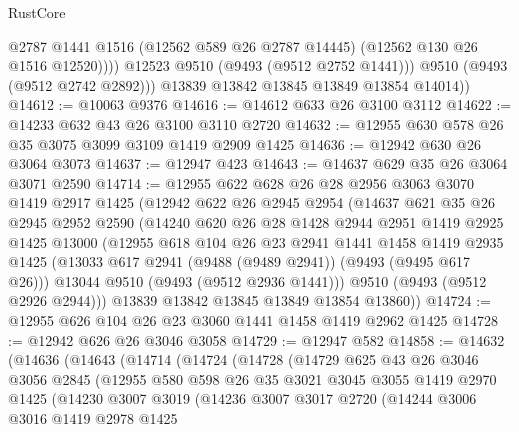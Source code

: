 \begin{lexlean}{RustCore}
\begin{coremodule}
                  @2787
                  @1441
                  @1516
                  (@12562 @589 @26 @2787 @14445)
                  (@12562 @130 @26 @1516 @12520))))
            @12523
            @9510
            (@9493 (@9512 @2752 @1441)))
          @9510
          (@9493 (@9512 @2742 @2892)))
        @13839
        @13842
        @13845
        @13849
        @13854
        @14014))
@14612 := @10063 @9376
@14616 := @14612 @633 @26 @3100 @3112
@14622 := @14233 @632 @43 @26 @3100 @3110 @2720
@14632 := @12955 @630 @578 @26 @35 @3075 @3099 @3109 @1419 @2909 @1425
@14636 := @12942 @630 @26 @3064 @3073
@14637 := @12947 @423
@14643 := @14637 @629 @35 @26 @3064 @3071 @2590
@14714 := @12955
    @622
    @628
    @26
    @28
    @2956
    @3063
    @3070
    @1419
    @2917
    @1425
    (@12942
      @622
      @26
      @2945
      @2954
      (@14637
        @621
        @35
        @26
        @2945
        @2952
        @2590
        (@14240
          @620
          @26
          @28
          @1428
          @2944
          @2951
          @1419
          @2925
          @1425
          @13000
          (@12955
            @618
            @104
            @26
            @23
            @2941
            @1441
            @1458
            @1419
            @2935
            @1425
            (@13033 @617 @2941 (@9488 (@9489 @2941)) (@9493 (@9495 @617 @26)))
            @13044
            @9510
            (@9493 (@9512 @2936 @1441)))
          @9510
          (@9493 (@9512 @2926 @2944)))
        @13839
        @13842
        @13845
        @13849
        @13854
        @13860))
@14724 := @12955 @626 @104 @26 @23 @3060 @1441 @1458 @1419 @2962 @1425
@14728 := @12942 @626 @26 @3046 @3058
@14729 := @12947 @582
@14858 := @14632
    (@14636
      (@14643
        (@14714
          (@14724
            (@14728
              (@14729
                @625
                @43
                @26
                @3046
                @3056
                @2845
                (@12955
                  @580
                  @598
                  @26
                  @35
                  @3021
                  @3045
                  @3055
                  @1419
                  @2970
                  @1425
                  (@14230
                    @3007
                    @3019
                    (@14236
                      @3007
                      @3017
                      @2720
                      (@14244
                        @3006
                        @3016
                        @1419
                        @2978
                        @1425

\end{coremodule}
\end{lexlean}
